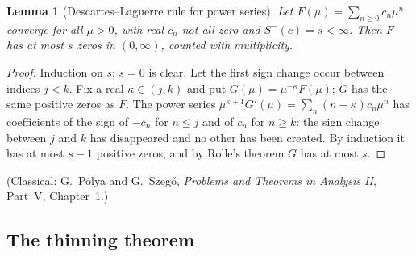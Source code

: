 \documentclass[11pt,a4paper]{article}
\newtheorem{lemma}[theorem]{Lemma}
\theoremstyle{definition}
\newcommand{\Sm}{S^{-}}
\begin{document}
\begin{lemma}[Descartes--Laguerre rule for power series]\label{lem:descartes}
Let $F(\mu)=\sum_{n\ge0}c_n\mu^n$ converge for all $\mu>0$, with real $c_n$ not all zero and $\Sm(c)=s<\infty$. Then $F$ has at most $s$ zeros in $(0,\infty)$, counted with multiplicity.
\end{lemma}
\begin{proof}
Induction on $s$; $s=0$ is clear. Let the first sign change occur between indices $j<k$. Fix a real $\kappa\in(j,k)$ and put $G(\mu)=\mu^{-\kappa}F(\mu)$; $G$ has the same positive zeros as $F$. The power series $\mu^{\kappa+1}G'(\mu)=\sum_n(n-\kappa)c_n\mu^n$ has coefficients of the sign of $-c_n$ for $n\le j$ and of $c_n$ for $n\ge k$: the sign change between $j$ and $k$ has disappeared and no other has been created. By induction it has at most $s-1$ positive zeros, and by Rolle's theorem $G$ has at most $s$.
\end{proof}
(Classical: G.~P\'olya and G.~Szeg\H{o}, \emph{Problems and Theorems in Analysis II}, Part~V, Chapter~1.)

\subsection{The thinning theorem}
\end{document}
